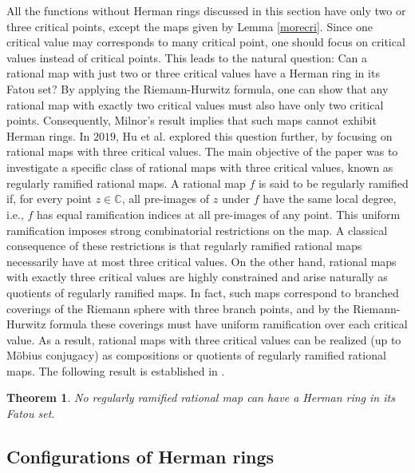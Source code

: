\documentclass[12pt]{article}
\newtheorem{theorem}{Theorem}[section]
\begin{document}
All the functions without Herman rings discussed in this section have only two or three critical points, except the maps given by Lemma \ref{morecri}. Since one critical value may corresponds to  many critical point,  one should focus on critical values instead of critical points. This leads to the natural question: Can a rational map with just two or three critical values have a Herman ring in its Fatou set? By applying the Riemann-Hurwitz formula, one can show that any rational map with exactly two critical values must also have only two critical points. Consequently, Milnor’s result \cite{Milnor2000} implies that such maps cannot exhibit Herman rings. In $2019$, Hu et al. \cite{hu} explored this question further, by focusing on rational maps with three critical values. The main objective of the paper was to investigate a specific class of rational maps with three critical values, known as regularly ramified rational maps. A rational map \( f \) is said to be regularly ramified if, for every point \( z \in \widehat{\mathbb{C}} \), all pre-images of \( z \) under \( f \) have the same local degree, i.e., \( f \) has equal ramification indices at all pre-images of any point. This uniform ramification imposes strong combinatorial restrictions on the map. A classical consequence of these restrictions is that regularly ramified rational maps necessarily have at most three critical values.
On the other hand, rational maps with exactly three critical values are highly constrained and arise naturally as quotients of regularly ramified maps. In fact, such maps correspond to branched coverings of the Riemann sphere with three branch points, and by the Riemann-Hurwitz formula these coverings must have uniform ramification over each critical value. As a result, rational maps with three critical values can be realized (up to Möbius conjugacy) as compositions or quotients of regularly ramified rational maps. The following result is established in \cite{hu}.

\begin{theorem}
    No regularly ramified rational map can have a Herman ring in its Fatou set.
\end{theorem}


\subsection{Configurations of Herman rings}
\end{document}
